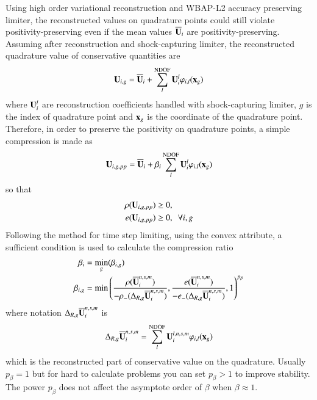 Using high order variational reconstruction and WBAP-L2
accuracy preserving limiter, the reconstructed values
on quadrature points could still violate positivity-preserving
even if the mean values $\overline{\mathbf{U}}_i$ are positivity-preserving.
Assuming after reconstruction and shock-capturing limiter,
the reconstructed quadrature value of conservative quantities are 
\begin{equation}
    \mathbf{U}_{i,g} = \overline{\mathbf{U}}_{i} + \sum_{l}^{\mathrm{NDOF}}{\mathbf{U}_i^l\varphi_{i,l}(\mathbf{x}_g)}
\end{equation}
where $\mathbf{U}_i^l$ are reconstruction coefficients 
handled with shock-capturing limiter, 
$g$ is the index of quadrature point and $\mathbf{x}_g$ is the coordinate of 
the quadrature point. 
Therefore, in order to preserve the positivity on 
quadrature points, a simple compression is made as
\begin{equation}
    \mathbf{U}_{i,g,pp} = \overline{\mathbf{U}}_{i} + \beta_i \sum_{l}^{\mathrm{NDOF}}{\mathbf{U}_i^l\varphi_{i,l}(\mathbf{x}_g)}
\end{equation}
so that 
\begin{equation}
    \begin{aligned}
        \rho(\mathbf{U}_{i,g,pp}) &\geq 0,\\
        e(\mathbf{U}_{i,g,pp}) &\geq 0 ,\ \ \forall i,g
    \end{aligned}
\end{equation}
Following the method for time step limiting, using 
the convex attribute, 
a sufficient condition is used to calculate the compression ratio
\begin{equation}
    \begin{aligned}
        \beta_{i} & = \min_g(\beta_{i,g})\\
        \beta_{i,g} & = \min\left(
            \frac{\rho(\overline{\mathbf{U}}_i^{n,s,m})}{-\rho_-(\mathrm\Delta_{R,g} \overline{\mathbf{U}}_i^{n,s,m})},
            \frac{e(\overline{\mathbf{U}}_i^{n,s,m})}{-e_-(\mathrm\Delta_{R,g} \overline{\mathbf{U}}_i^{n,s,m})},
            1
            \right)^{p_\beta}
    \end{aligned}
\end{equation}
where notation $\mathrm\Delta_{R,g} \overline{\mathbf{U}}_i^{n,s,m}$ is 
\begin{equation}
    \mathrm\Delta_{R,g} \overline{\mathbf{U}}_i^{n,s,m} = \sum_{l}^{\mathrm{NDOF}}{\mathbf{U}_i^{l,n,s,m}\varphi_{i,l}(\mathbf{x}_g)}
\end{equation}
which is the reconstructed part of conservative value on the quadrature.
Usually $p_\beta=1$ but for hard to calculate problems you can set $p_\beta>1$
to improve stability. The power $p_\beta$ does not affect 
the asymptote order of $\beta$ when $\beta\approx 1$.

